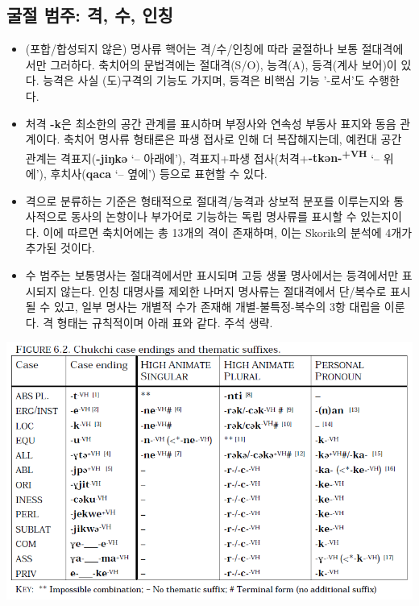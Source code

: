 \subsection{굴절 범주: 격, 수, 인칭}
\begin{itemize}
	\item (포합/합성되지 않은) 명사류 핵어는 격/수/인칭에 따라 굴절하나 보통 절대격에서만 그러하다. 축치어의 문법격에는 절대격(S/O), 능격(A), 등격(계사 보어)이 있다. 능격은 사실 (도)구격의 기능도 가지며, 등격은 비핵심 기능 '-로서'도 수행한다.
	\item 처격 \textbf{-k}은 최소한의 공간 관계를 표시하며 부정사와 연속성 부동사 표지와 동음 관계이다. 축치어 명사류 형태론은 파생 접사로 인해 더 복잡해지는데, 예컨대 공간 관계는 격표지(\textbf{-jiŋkə} `-- 아래에'), 격표지+파생 접사(처격+\textbf{-tkən-\textsuperscript{+VH}} `-- 위에'), 후치사(\textbf{qaca} `-- 옆에') 등으로 표현할 수 있다.
	\item 격으로 분류하는 기준은 형태적으로 절대격/능격과 상보적 분포를 이루는지와 통사적으로 동사의 논항이나 부가어로 기능하는 독립 명사류를 표시할 수 있는지이다. 이에 따르면 축치어에는 총 13개의 격이 존재하며, 이는 Skorik의 분석에 4개가 추가된 것이다.
	\item 수 범주는 보통명사는 절대격에서만 표시되며 고등 생물 명사에서는 등격에서만 표시되지 않는다. 인칭 대명사를 제외한 나머지 명사류는 절대격에서 단/복수로 표시될 수 있고, 일부 명사는 개별적 수가 존재해 개별-불특정-복수의 3항 대립을 이룬다. 격 형태는 규칙적이며 아래 표와 같다. 주석 생략.
\end{itemize}
\begin{center}
\includegraphics[width=\linewidth]{Chukchi/src/chca.png}
\end{center}
